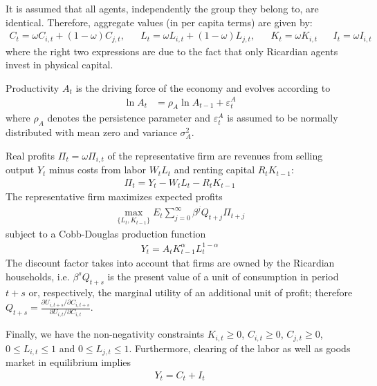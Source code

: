 It is assumed that all agents, independently the group they belong to, are identical. Therefore, aggregate values (in per capita terms) are given by:
\begin{align*}
    C_t = \omega C_{i,t} + (1-\omega)C_{j,t}, &  & L_t = \omega L_{i,t} + (1-\omega)L_{j,t}, &  & K_t = \omega K_{i,t} &  & I_t = \omega I_{i,t}
\end{align*}
where the right two expressions are due to the fact that only Ricardian agents invest in physical capital.

Productivity $A_t$ is the driving force of the economy and evolves according to
\begin{align*}
    \ln{A_{t}} & = \rho_A \ln{A_{t-1}}  + \varepsilon_t^A
\end{align*}
where $\rho_A$ denotes the persistence parameter and $\varepsilon_t^A$ is assumed to be normally distributed with mean zero and variance $\sigma_A^2$.

Real profits $\Pi_t = \omega \Pi_{i,t}$ of the representative firm are revenues from selling output $Y_t$ minus costs from labor $W_t L_t$ and renting capital $R_t K_{t-1}$:
\begin{align*}
    \Pi_t = Y_{t} - W_{t} L_{t} - R_{t} K_{t-1}
\end{align*}
The representative firm maximizes expected profits
\begin{align*}
    \underset{\{L_{t},K_{t-1}\}}{\max} E_t \sum_{j=0}^{\infty} \beta^j Q_{t+j}\Pi_{t+j}
\end{align*}
subject to a Cobb-Douglas production function
\begin{align*}
    Y_t = A_t K_{t-1}^\alpha L_t^{1-\alpha}
\end{align*}
The discount factor takes into account that firms are owned by the Ricardian households, i.e. $\beta^s Q_{t+s}$ is the present value of a unit of consumption in period $t+s$ or, respectively, the marginal utility of an additional unit of profit; therefore $Q_{t+s}=\frac{\partial U_{i,t+s}/\partial C_{i,t+s}}{\partial U_{i,t}/\partial C_{i,t}}$.

Finally, we have the non-negativity constraints	$K_{i,t} \geq0$, $C_{i,t} \geq 0$, $C_{j,t} \geq 0$, $0\leq L_{i,t} \leq 1$ and $0\leq L_{j,t} \leq 1$. Furthermore, clearing of the labor as well as goods market in equilibrium implies
\begin{align*}
    Y_t = C_t + I_t
\end{align*}

